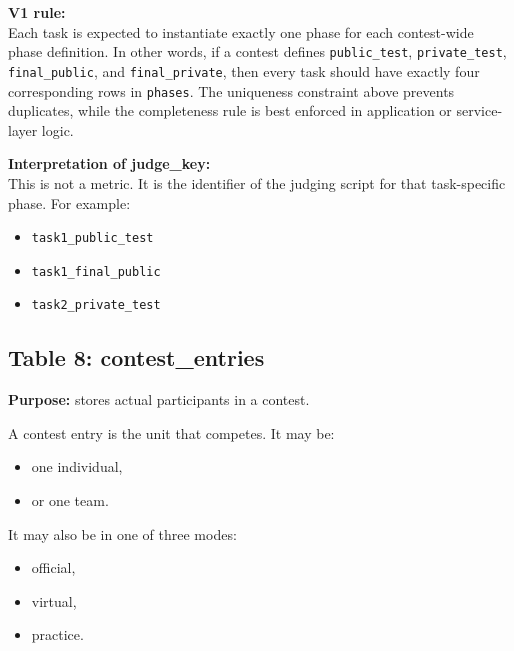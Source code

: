 \documentclass[11pt,a4paper]{article}
\begin{document}
\textbf{V1 rule:}\\
Each task is expected to instantiate exactly one phase for each contest-wide phase definition. In other words, if a contest defines \texttt{public\_test}, \texttt{private\_test}, \texttt{final\_public}, and \texttt{final\_private}, then every task should have exactly four corresponding rows in \texttt{phases}. The uniqueness constraint above prevents duplicates, while the completeness rule is best enforced in application or service-layer logic.

\textbf{Interpretation of judge\_key:}\\
This is not a metric. It is the identifier of the judging script for that task-specific phase. For example:
\begin{itemize}
    \item \texttt{task1\_public\_test}
    \item \texttt{task1\_final\_public}
    \item \texttt{task2\_private\_test}
\end{itemize}

\subsection{Table 8: contest\_entries}
\textbf{Purpose:} stores actual participants in a contest.

A contest entry is the unit that competes. It may be:
\begin{itemize}
    \item one individual,
    \item or one team.
\end{itemize}

It may also be in one of three modes:
\begin{itemize}
    \item official,
    \item virtual,
    \item practice.
\end{itemize}
\end{document}
